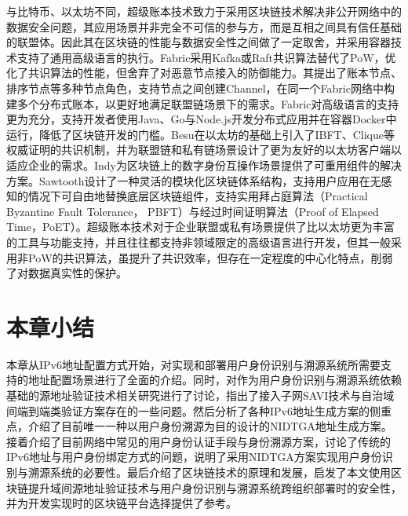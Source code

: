     与比特币、以太坊不同，超级账本技术\cite{dhillon2017hyperledger}致力于采用区块链技术解决非公开网络中的数据安全问题，其应用场景并非完全不可信的参与方，而是互相之间具有信任基础的联盟体。因此其在区块链的性能与数据安全性之间做了一定取舍，并采用容器技术支持了通用高级语言的执行。Fabric\cite{androulaki2018hyperledger}采用Kafka\cite{thein2014apache}或Raft\cite{ongaro2014search}共识算法替代了PoW，优化了共识算法的性能，但舍弃了对恶意节点接入的防御能力。其提出了账本节点、排序节点等多种节点角色，支持节点之间创建Channel，在同一个Fabric网络中构建多个分布式账本，以更好地满足联盟链场景下的需求。Fabric对高级语言的支持更为充分，支持开发者使用Java、Go与Node.js开发分布式应用并在容器Docker中运行，降低了区块链开发的门槛。Besu\cite{Besu}在以太坊的基础上引入了IBFT、Clique等权威证明的共识机制，并为联盟链和私有链场景设计了更为友好的以太坊客户端以适应企业的需求。Indy\cite{Indy}为区块链上的数字身份互操作场景提供了可重用组件的解决方案。Sawtooth\cite{Sawtooth}设计了一种灵活的模块化区块链体系结构，支持用户应用在无感知的情况下可自由地替换底层区块链组件，支持实用拜占庭算法（Practical Byzantine Fault Tolerance， PBFT）\cite{castro1999practical}与经过时间证明算法（Proof of Elapsed Time，PoET）\cite{rilee2018understanding}。超级账本技术对于企业联盟或私有场景提供了比以太坊更为丰富的工具与功能支持，并且往往都支持非领域限定的高级语言进行开发，但其一般采用非PoW的共识算法，虽提升了共识效率，但存在一定程度的中心化特点，削弱了对数据真实性的保护。

  \section{本章小结}
  \label{survey:summary}
  本章从IPv6地址配置方式开始，对实现和部署用户身份识别与溯源系统所需要支持的地址配置场景进行了全面的介绍。同时，对作为用户身份识别与溯源系统依赖基础的源地址验证技术相关研究进行了讨论，指出了接入子网SAVI技术与自治域间端到端类验证方案存在的一些问题。然后分析了各种IPv6地址生成方案的侧重点，介绍了目前唯一一种以用户身份溯源为目的设计的NIDTGA地址生成方案。接着介绍了目前网络中常见的用户身份认证手段与身份溯源方案，讨论了传统的IPv6地址与用户身份绑定方式的问题，说明了采用NIDTGA方案实现用户身份识别与溯源系统的必要性。最后介绍了区块链技术的原理和发展，启发了本文使用区块链提升域间源地址验证技术与用户身份识别与溯源系统跨组织部署时的安全性，并为开发实现时的区块链平台选择提供了参考。



